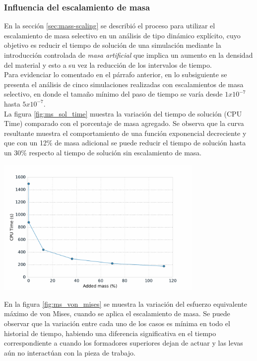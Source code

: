 \subsubsection{Influencia del escalamiento de masa}\label{sec:mass-scaling-results}

En la sección \ref{sec:mass-scaling} se describió el proceso para utilizar el escalamiento de masa 
selectivo en un análisis de tipo dinámico explícito, cuyo objetivo es reducir el tiempo de 
solución de una simulación mediante la introducción controlada de \textit{masa artificial} que implica 
un aumento en la densidad del material y esto a su vez la reducción de los intervalos de tiempo.\\

Para evidenciar lo comentado en el párrafo anterior, en lo subsiguiente se presenta el análisis de cinco simulaciones realizadas con escalamientos de 
masa selectivo, en donde el tamaño mínimo del paso de tiempo se varía desde $1x10^{-7}$ hasta 
$5x10^{-7}$.\\

La figura \ref{fig:ms_sol_time} muestra la variación del tiempo de solución (CPU Time) comparado con 
el porcentaje de masa agregado. Se observa que la curva resultante muestra el comportamiento de 
una función exponencial decreciente y que con un 12\% de masa adicional se puede reducir el tiempo 
de solución hasta un 30\% respecto al tiempo de solución sin escalamiento de masa.

\begin{center}
\includegraphics[width=0.75\textwidth]{src/ch4/ms_sol_time.pdf}
\label{fig:ms_sol_time}
\end{center}

En la figura \ref{fig:ms_von_mises} se muestra la variación del esfuerzo equivalente máximo de von Mises, cuando 
se aplica el escalamiento de masa. Se puede observar que la variación entre cada uno de los casos 
es mínima en todo el historial de tiempo, habiendo una diferencia significativa en el tiempo 
correspondiente a cuando los formadores superiores dejan de actuar y las levas aún no interactúan 
con la pieza de trabajo.

